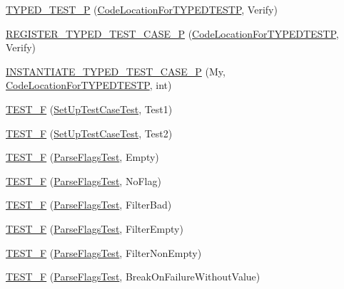 \begin{DoxyCompactItemize}
\item 
\mbox{\hyperlink{namespacetesting_a3f3fbbc7ecc23117307b81deb8f4cfac}{T\+Y\+P\+E\+D\+\_\+\+T\+E\+S\+T\+\_\+P}} (\mbox{\hyperlink{classtesting_1_1CodeLocationForTYPEDTESTP}{Code\+Location\+For\+T\+Y\+P\+E\+D\+T\+E\+S\+TP}}, Verify)
\item 
\mbox{\hyperlink{namespacetesting_a9fc96ebb1c0e7db169c4a5697c903f56}{R\+E\+G\+I\+S\+T\+E\+R\+\_\+\+T\+Y\+P\+E\+D\+\_\+\+T\+E\+S\+T\+\_\+\+C\+A\+S\+E\+\_\+P}} (\mbox{\hyperlink{classtesting_1_1CodeLocationForTYPEDTESTP}{Code\+Location\+For\+T\+Y\+P\+E\+D\+T\+E\+S\+TP}}, Verify)
\item 
\mbox{\hyperlink{namespacetesting_a111c1dea1140652727ab97ddc13eb045}{I\+N\+S\+T\+A\+N\+T\+I\+A\+T\+E\+\_\+\+T\+Y\+P\+E\+D\+\_\+\+T\+E\+S\+T\+\_\+\+C\+A\+S\+E\+\_\+P}} (My, \mbox{\hyperlink{classtesting_1_1CodeLocationForTYPEDTESTP}{Code\+Location\+For\+T\+Y\+P\+E\+D\+T\+E\+S\+TP}}, int)
\item 
\mbox{\hyperlink{namespacetesting_a01e948eb5427d31f70eafaf472e2bfa8}{T\+E\+S\+T\+\_\+F}} (\mbox{\hyperlink{classtesting_1_1SetUpTestCaseTest}{Set\+Up\+Test\+Case\+Test}}, Test1)
\item 
\mbox{\hyperlink{namespacetesting_a8fc2e448ce96e4da357a2129d49e86e3}{T\+E\+S\+T\+\_\+F}} (\mbox{\hyperlink{classtesting_1_1SetUpTestCaseTest}{Set\+Up\+Test\+Case\+Test}}, Test2)
\item 
\mbox{\hyperlink{namespacetesting_a9072b690c3c0e3b6af327fa72fe821c4}{T\+E\+S\+T\+\_\+F}} (\mbox{\hyperlink{classtesting_1_1ParseFlagsTest}{Parse\+Flags\+Test}}, Empty)
\item 
\mbox{\hyperlink{namespacetesting_ab2b5d94a0dd45cb06473bdd7900e23af}{T\+E\+S\+T\+\_\+F}} (\mbox{\hyperlink{classtesting_1_1ParseFlagsTest}{Parse\+Flags\+Test}}, No\+Flag)
\item 
\mbox{\hyperlink{namespacetesting_a3b7a3374630035ab3cf2125a0c960435}{T\+E\+S\+T\+\_\+F}} (\mbox{\hyperlink{classtesting_1_1ParseFlagsTest}{Parse\+Flags\+Test}}, Filter\+Bad)
\item 
\mbox{\hyperlink{namespacetesting_ac368692db2bffa72a1bf12f3469efec0}{T\+E\+S\+T\+\_\+F}} (\mbox{\hyperlink{classtesting_1_1ParseFlagsTest}{Parse\+Flags\+Test}}, Filter\+Empty)
\item 
\mbox{\hyperlink{namespacetesting_a31336a2ed0eea5de8066f5ae528a7ae0}{T\+E\+S\+T\+\_\+F}} (\mbox{\hyperlink{classtesting_1_1ParseFlagsTest}{Parse\+Flags\+Test}}, Filter\+Non\+Empty)
\item 
\mbox{\hyperlink{namespacetesting_ab540cabc9d829c20052609a685a01832}{T\+E\+S\+T\+\_\+F}} (\mbox{\hyperlink{classtesting_1_1ParseFlagsTest}{Parse\+Flags\+Test}}, Break\+On\+Failure\+Without\+Value)

\end{DoxyCompactItemize}
